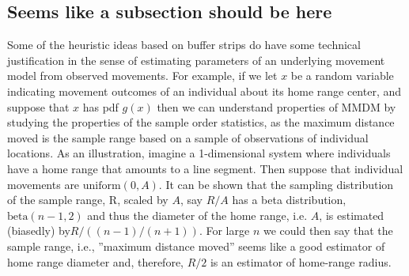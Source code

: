 \subsection{Seems like a subsection should be here}

Some of the heuristic ideas based on buffer strips do have some
technical justification in the sense of estimating parameters of an
underlying movement model from observed movements. For example, if we
let $x$ be a random variable indicating movement outcomes of an
individual about its  home range center, and suppose that $x$ has pdf
$g(x)$ then we can understand properties of MMDM by studying the
properties of the sample order statistics, as the maximum distance
moved is the sample range based on a sample of observations of
individual locations. As an illustration, imagine a 1-dimensional
system where individuals have a home range that amounts to a line
segment. Then suppose that individual movements are $\mbox{uniform}(0,A)$. It
can be shown that the sampling distribution of the sample range, R,
scaled by $A$, say $R/A$ has a beta distribution, $\mbox{beta}(n-1,2)$ 
\citep[][p. 235]{casella_berger:2002}
and thus the diameter of the home range, i.e. $A$, is
estimated (biasedly) by$ R/( (n-1)/(n+1) )$. For large $n$ we could then
say that the sample range, i.e., ''maximum distance moved'' seems like a good estimator of home range diameter and, therefore, $R/2$ is an estimator of home-range radius.  

